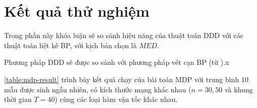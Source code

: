 \documentclass[../main.tex]{subfiles}
\begin{document}
\section{Kết quả thử nghiệm}\label{nhux1eefng-lux1ee3i-uxedch-cux1ee7a-ddd}

Trong phần này khóa luận sẽ so sánh hiệu năng của thuật toán DDD với các thuật
toán liệt kê BP, với kịch bản chọn là \(MED\).

Phương pháp DDD sẽ được so sánh với phương pháp vét cạn BP (từ \cite{foschini2011complexity}).x

\autoref{table:mdp-result} trình bày kết quả chạy của bài toán MDP với trung bình 10 mẫu được sinh ngẫu
nhiên, có kích thước mạng khác nhau (\(n=30,50\) và khung thời gian
\(T=40\)) cùng các loại hàm vận tốc khác nhau.

\end{document}
